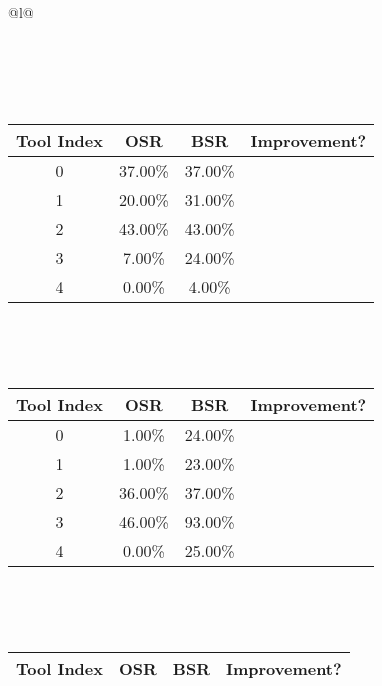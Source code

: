 \begin{longtable}{@{}l@{}}
\begin{minipage}{\textwidth}
\begin{tabular}{|c|c|c|c|}
\end{tabular}
\end{minipage}\\[2ex]
\begin{minipage}{\textwidth}
\centering\vspace{2ex}
\\[0.8ex]
\begin{tabular}{|c|c|c|c|} \hline
\textbf{Tool Index} & \textbf{OSR} & \textbf{ BSR} & \textbf{Improvement?} \\ \hline
0 & 37.00\% & 37.00\% & \textcolor{red}{\ding{55}} \\ \hline
1 & 20.00\% & 31.00\% & \textcolor{green}{\ding{51}} \\ \hline
2 & 43.00\% & 43.00\% & \textcolor{red}{\ding{55}} \\ \hline
3 & 7.00\% & 24.00\% & \textcolor{green}{\ding{51}} \\ \hline
4 & 0.00\% & 4.00\% & \textcolor{green}{\ding{51}} \\ \hline
\end{tabular}
\end{minipage}\\[2ex]
\begin{minipage}{\textwidth}
\centering\vspace{2ex}
\\[0.8ex]
\begin{tabular}{|c|c|c|c|} \hline
\textbf{Tool Index} & \textbf{OSR} & \textbf{ BSR} & \textbf{Improvement?} \\ \hline
0 & 1.00\% & 24.00\% & \textcolor{green}{\ding{51}} \\ \hline
1 & 1.00\% & 23.00\% & \textcolor{green}{\ding{51}} \\ \hline
2 & 36.00\% & 37.00\% & \textcolor{green}{\ding{51}} \\ \hline
3 & 46.00\% & 93.00\% & \textcolor{green}{\ding{51}} \\ \hline
4 & 0.00\% & 25.00\% & \textcolor{green}{\ding{51}} \\ \hline
\end{tabular}
\end{minipage}\\[2ex]
\begin{minipage}{\textwidth}
\centering\vspace{2ex}
\\[0.8ex]
\begin{tabular}{|c|c|c|c|} \hline
\textbf{Tool Index} & \textbf{OSR} & \textbf{ BSR} & \textbf{Improvement?} \\ \hline

\end{tabular}
\end{minipage}
\end{longtable}
